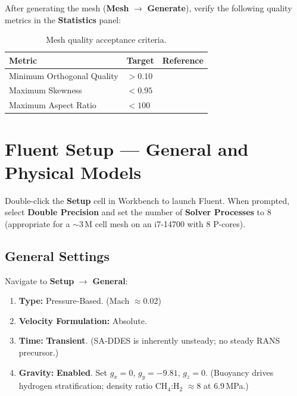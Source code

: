 \documentclass[12pt,a4paper]{report}
\begin{document}
After generating the mesh (\textbf{Mesh} $\rightarrow$ \textbf{Generate}),
verify the following quality metrics in the \textbf{Statistics} panel:

\begin{table}[H]
\centering
\caption{Mesh quality acceptance criteria.}
\label{tab:meshqual}
\begin{tabular}{@{}lll@{}}
\toprule
\textbf{Metric} & \textbf{Target} & \textbf{Reference} \\
\midrule
Minimum Orthogonal Quality & $> 0.10$ & \cite{ANSYSFluentUG2024} \\
Maximum Skewness           & $< 0.95$ & \cite{ANSYSFluentUG2024} \\
Maximum Aspect Ratio       & $< 100$  & \cite{ANSYSFluentUG2024} \\
\bottomrule
\end{tabular}
\end{table}


\chapter{Fluent Setup --- General and Physical Models}
\label{ch:models}

Double-click the \textbf{Setup} cell in Workbench to launch Fluent.
When prompted, select \textbf{Double Precision} and set the number of
\textbf{Solver Processes} to 8 (appropriate for a $\sim$3\,M cell mesh on an
i7-14700 with 8 P-cores).

\section{General Settings}

Navigate to \textbf{Setup} $\rightarrow$ \textbf{General}:

\begin{enumerate}
  \item \textbf{Type:} Pressure-Based.  \quad(Mach $\approx 0.02$)
  \item \textbf{Velocity Formulation:} Absolute.
  \item \textbf{Time:} \textbf{Transient}.  \quad(SA-DDES is inherently
        unsteady; no steady RANS precursor.)
  \item \textbf{Gravity:} \textbf{Enabled}.  Set $g_x = 0$,
        $g_y = -9.81$, $g_z = 0$.  \quad(Buoyancy drives hydrogen
        stratification; density ratio CH$_4$:H$_2$ $\approx 8$ at
        6.9\,MPa.)
\end{enumerate}
\end{document}
